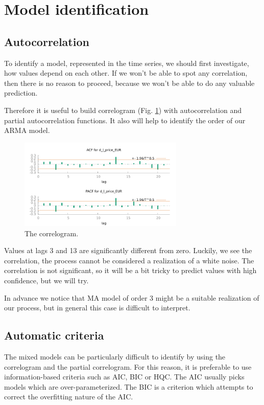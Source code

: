 \documentclass[14pt,a4paper]{extarticle}
\newcounter{e}
\newcounter{pic}
\newcounter{tabl}
\numberwithin{equation}{section}
\numberwithin{figure}{section}
\begin{document}
\section{Model identification}
\subsection{Autocorrelation}
To identify a model, represented in the time series, we should first investigate, how values depend on each other. If we won't be able to spot any correlation, then there is no reason to proceed, because we won't be able to do any valuable prediction. 

Therefore it is useful to build correlogram (Fig. \ref{fig:correlogram}) with autocorrelation and partial autocorrelation functions. It also will help to identify the order of our ARMA model.

\begin{figure}[h!]
	\hspace{-1.5cm}
	\centering
	\includegraphics[width=0.7\textwidth]{resources/correlogram.pdf}
	\caption{The correlogram.}
	\label{fig:correlogram}
\end{figure}

Values at lags 3 and 13 are significantly different from zero. Luckily, we see the correlation, the process cannot be considered a realization of a white noise. The correlation is not significant, so it will be a bit tricky to predict values with high confidence, but we will try.

In advance we notice that MA model of order 3 might be a suitable realization of our process, but in general this case is difficult to interpret.

\subsection{Automatic criteria}

The mixed models can be particularly difficult to identify by
using the correlogram and the partial correlogram. For this reason, it is preferable to use information-based criteria such
as AIC, BIC or HQC. The AIC usually picks models which are over-parameterized.
The BIC is a criterion which attempts to correct the overfitting nature of the AIC.
\end{document}
